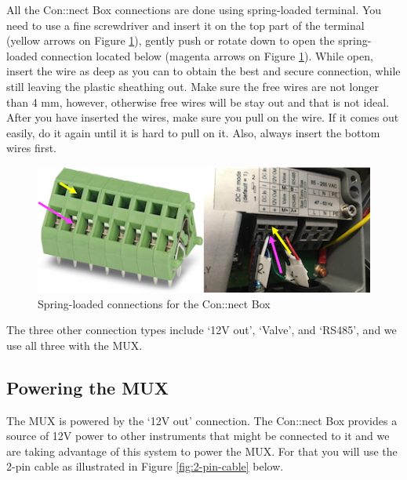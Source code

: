 \documentclass[]{book}
\begin{document}
All the Con::nect Box connections are done using spring-loaded terminal. You need to use a fine screwdriver and insert it on the top part of the terminal (yellow arrows on Figure \ref{fig:SpringLoadedTerminal}), gently push or rotate down to open the spring-loaded connection located below (magenta arrows on Figure \ref{fig:SpringLoadedTerminal}). While open, insert the wire as deep as you can to obtain the best and secure connection, while still leaving the plastic sheathing out. Make sure the free wires are not longer than 4 mm, however, otherwise free wires will be stay out and that is not ideal. After you have inserted the wires, make sure you pull on the wire. If it comes out easily, do it again until it is hard to pull on it. Also, always insert the bottom wires first.

\begin{figure}

{\centering \includegraphics[width=0.9\linewidth]{pictures/SpringLoadedConnections} 

}

\caption{Spring-loaded connections for the Con::nect Box}\label{fig:SpringLoadedTerminal}
\end{figure}

The three other connection types include `12V out', `Valve', and `RS485', and we use all three with the MUX.

\hypertarget{powering-the-mux}{%
\subsection{Powering the MUX}\label{powering-the-mux}}

The MUX is powered by the `12V out' connection. The Con::nect Box provides a source of 12V power to other instruments that might be connected to it and we are taking advantage of this system to power the MUX. For that you will use the 2-pin cable as illustrated in Figure \ref{fig:2-pin-cable} below.
\end{document}
